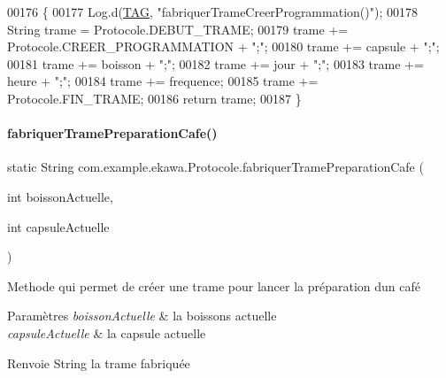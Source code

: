 \begin{DoxyCode}
00176     \{
00177         Log.d(\hyperlink{classcom_1_1example_1_1ekawa_1_1_protocole_ae9b68fa0daac528421b887f19413f8f5}{TAG}, \textcolor{stringliteral}{"fabriquerTrameCreerProgrammation()"});
00178         String trame = Protocole.DEBUT\_TRAME;
00179         trame += Protocole.CREER\_PROGRAMMATION + \textcolor{stringliteral}{";"};
00180         trame += capsule + \textcolor{stringliteral}{";"};
00181         trame += boisson + \textcolor{stringliteral}{";"};
00182         trame += jour + \textcolor{stringliteral}{";"};
00183         trame += heure + \textcolor{stringliteral}{";"};
00184         trame += frequence;
00185         trame += Protocole.FIN\_TRAME;
00186         \textcolor{keywordflow}{return} trame;
00187     \}
\end{DoxyCode}
\mbox{\label{classcom_1_1example_1_1ekawa_1_1_protocole_a95497419a17cd6ba14663af6c20d7797}} 
\paragraph{\texorpdfstring{fabriquer\+Trame\+Preparation\+Cafe()}{fabriquerTramePreparationCafe()}}
{\footnotesize\ttfamily static String com.\+example.\+ekawa.\+Protocole.\+fabriquer\+Trame\+Preparation\+Cafe (\begin{DoxyParamCaption}\item[{int}]{boisson\+Actuelle,  }\item[{int}]{capsule\+Actuelle }\end{DoxyParamCaption})\hspace{0.3cm}{\ttfamily [static]}}



Methode qui permet de créer une trame pour lancer la préparation d\textquotesingle{}un café 


\begin{DoxyParams}{Paramètres}
{\em boisson\+Actuelle} & la boissons actuelle \\
\hline
{\em capsule\+Actuelle} & la capsule actuelle \\
\hline
\end{DoxyParams}
\begin{DoxyReturn}{Renvoie}
String la trame fabriquée 
\end{DoxyReturn}


